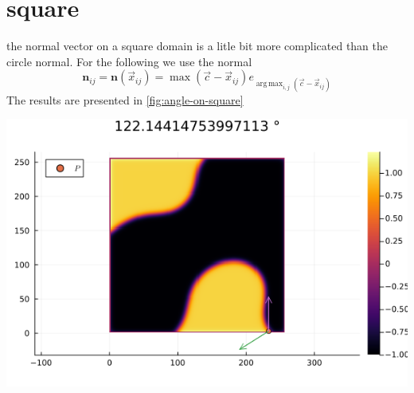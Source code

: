 \documentclass{mimosis}
\DeclareMathOperator*{\argmax}{arg\,\max}
\begin{document}
\section{square}
\label{sec:org0645f89}
the normal vector on a square domain is a litle bit more complicated than the circle normal. For the following we use the normal
\begin{equation}
\label{eq:9}
\mathbf{n}_{ij} = \mathbf{n}(\vec{x}_{ij}) = \max(\vec{c} - \vec{x}_{ij}) e_{\argmax_{i,j}(\vec{c} - \vec{x}_{ij})}
\end{equation}
The results are presented in \ref{fig:angle-on-square}
\begin{center}
\includegraphics[width=.9\linewidth]{images/angle-square.png}
\label{fig:angle-on-square}
\end{center}
\end{document}
